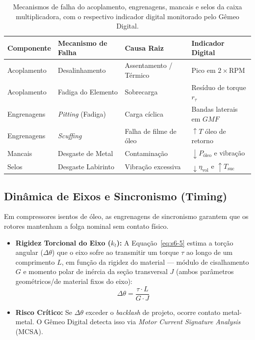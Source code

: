 \documentclass[12pt,a4paper]{article}
\numberwithin{equation}{section}
\numberwithin{table}{section}
\numberwithin{figure}{section}
\begin{document}
	\begin{table}[h!]
		\centering
		\small
		\begin{tabular}{|l|l|l|l|}
			\hline
			\textbf{Componente} & \textbf{Mecanismo de Falha} & \textbf{Causa Raiz} & \textbf{Indicador Digital} \\ \hline
			Acoplamento & Desalinhamento & Assentamento / Térmico & Pico em $2 \times \text{RPM}$ \\ \hline
			Acoplamento & Fadiga do Elemento & Sobrecarga & Resíduo de torque $r_{\tau}$ \\ \hline
			Engrenagens & \textit{Pitting} (Fadiga) & Carga cíclica & Bandas laterais em $GMF$ \\ \hline
			Engrenagens & \textit{Scuffing} & Falha de filme de óleo & $\uparrow T$ óleo de retorno \\ \hline
			Mancais & Desgaste de Metal & Contaminação & $\downarrow P_{\text{óleo}}$ e vibração \\ \hline
			Selos & Desgaste Labirinto & Vibração excessiva & $\downarrow \eta_{\text{vol}}$ e $\uparrow T_{\text{suc}}$ \\ \hline
		\end{tabular}
		\caption{Mecanismos de falha do acoplamento, engrenagens, mancais e selos da caixa multiplicadora, com o respectivo indicador digital monitorado pelo Gêmeo Digital.}
	\end{table}
	
	\subsection{\textbf{Dinâmica de Eixos e Sincronismo (Timing)}}
	Em compressores isentos de óleo, as engrenagens de sincronismo garantem que os rotores mantenham a folga nominal sem contato físico.
	\begin{itemize}
		\item \textbf{Rigidez Torcional do Eixo ($k_t$):} A Equação~\eqref{eq:s6-5} estima a torção angular ($\Delta \theta$) que o eixo sofre ao transmitir um torque $\tau$ ao longo de um comprimento $L$, em função da rigidez do material — módulo de cisalhamento $G$ e momento polar de inércia da seção transversal $J$ (ambos parâmetros geométricos/de material fixos do eixo):
		\begin{equation}\label{eq:s6-5}
 \Delta \theta = \frac{\tau \cdot L}{G \cdot J}
\end{equation}
		\item \textbf{Risco Crítico:} Se $\Delta \theta$ exceder o \textit{backlash} de projeto, ocorre contato metal-metal. O Gêmeo Digital detecta isso via \textit{Motor Current Signature Analysis} (MCSA).
	\end{itemize}
	
\end{document}
